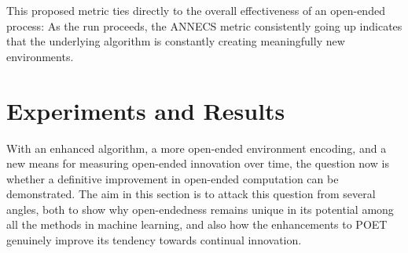 \documentclass{article}
\newcommand{\removed}[1]{\comments{\textcolor{gray}{\sout{#1}}}}
\newcommand{\comments}[1]{#1} %
\begin{document}
This proposed metric ties directly to the overall effectiveness of an open-ended process: As the run proceeds, the ANNECS metric consistently going up indicates that the underlying algorithm is constantly creating meaningfully new environments. 


\section{Experiments and Results}
\label{experiments}

With an enhanced algorithm, a more open-ended environment encoding, and a new means for measuring open-ended innovation over time, the question now is whether a definitive improvement in open-ended computation can be demonstrated.  The aim in this section is to attack this question from several angles, both to show why open-endedness remains unique in its potential among all the methods in machine learning, and also how the enhancements to POET genuinely improve its tendency towards continual innovation.  
\end{document}
